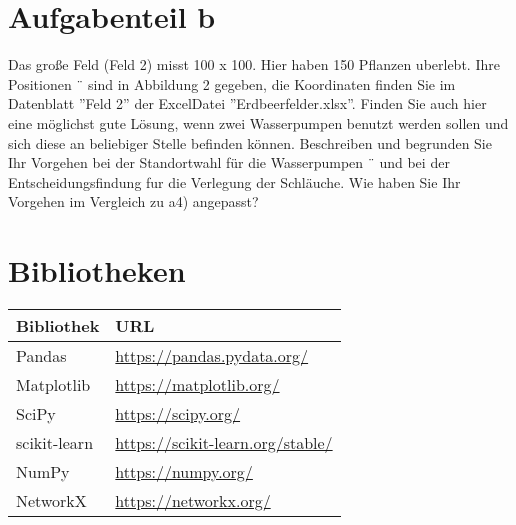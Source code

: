 \documentclass[12pt,titlepage]{article}
\numberwithin{equation}{section}
\begin{document}







\section{Aufgabenteil b}
Das große Feld (Feld 2) misst 100 x 100. Hier haben 150 Pflanzen uberlebt. Ihre Positionen ¨
sind in Abbildung 2 gegeben, die Koordinaten finden Sie im Datenblatt ”Feld 2” der ExcelDatei ”Erdbeerfelder.xlsx”. Finden Sie auch hier eine möglichst gute Lösung, wenn zwei
Wasserpumpen benutzt werden sollen und sich diese an beliebiger Stelle befinden können.
Beschreiben und begrunden Sie Ihr Vorgehen bei der Standortwahl für die Wasserpumpen ¨
und bei der Entscheidungsfindung fur die Verlegung der Schläuche. Wie haben Sie Ihr Vorgehen im Vergleich zu a4) angepasst?





\section{Bibliotheken}
\begin{table}[h]
    \centering
    \begin{tabular}{|l|l|}
    \hline
    \textbf{Bibliothek} & \textbf{URL} \\
    \hline
    Pandas & \url{https://pandas.pydata.org/} \\
    \hline
    Matplotlib & \url{https://matplotlib.org/} \\
    \hline
    SciPy & \url{https://scipy.org/} \\
    \hline
    scikit-learn & \url{https://scikit-learn.org/stable/} \\
    \hline
    NumPy & \url{https://numpy.org/} \\
    \hline
    NetworkX & \url{https://networkx.org/} \\
    \hline
    \end{tabular}
    \end{table}
    
\end{document}
